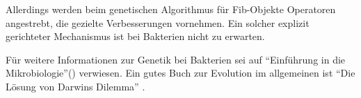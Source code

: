 Allerdings werden beim genetischen Algorithmus für Fib-Objekte Operatoren angestrebt, die gezielte Verbesserungen vornehmen. Ein solcher explizit gerichteter Mechanismus ist bei Bakterien nicht zu erwarten.

Für weitere Informationen zur Genetik bei Bakterien sei auf ``Einführung in die Mikrobiologie''(\cite{genTrans}) verwiesen. Ein gutes Buch zur Evolution im allgemeinen ist ``Die Lösung von Darwins Dilemma'' \cite{LDD_2007} .
















